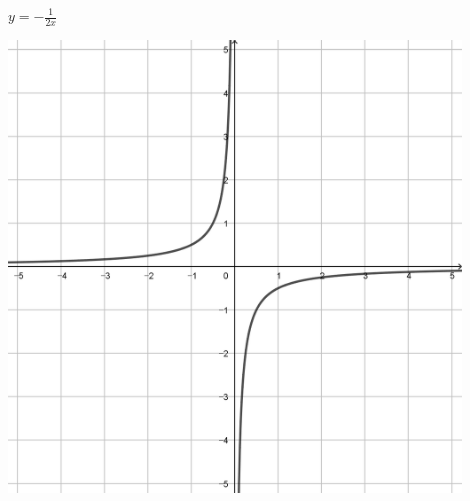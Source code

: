 \documentclass[a4paper]{oblivoir}
\begin{document}
\begin{minipage}{0.45\textwidth}\centering
\(y=-\frac1{2x}\)
\par\bigskip\includegraphics[width=0.9\textwidth]{img/18-5}
\end{minipage}\bigskip\bigskip\par
\end{document}
